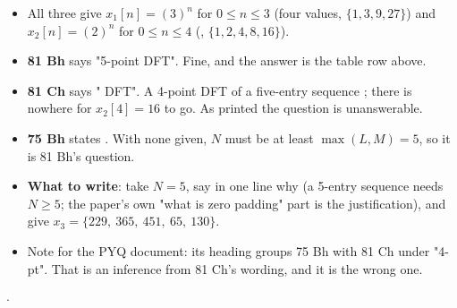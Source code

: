 %
{} {\color{sub}\footnotesize {}}
\begin{itemize}
  \item All three give $x_1[n]=(3)^n$ for $0\le n\le3$ (four values, $\{1,3,9,27\}$) and
        $x_2[n]=(2)^n$ for $0\le n\le4$ (, $\{1,2,4,8,16\}$).
  \item \textbf{81 Bh} says "5-point DFT". Fine, and the answer is the table row above.
  \item \textbf{81 Ch} says " DFT". A 4-point DFT of a five-entry sequence
        ; there is nowhere for $x_2[4]=16$ to go. As printed the
        question is unanswerable.
  \item \textbf{75 Bh} states . With none given, $N$ must be at least
        $\max(L,M)=5$, so it is 81 Bh's question.
  \item \textbf{What to write}: take $N=5$, say in one line why (a 5-entry sequence
        needs $N\ge5$; the paper's own "what is zero padding" part is the justification),
        and give $x_3=\{229,\ 365,\ 451,\ 65,\ 130\}$. 
  \item Note for the PYQ document: its heading groups 75 Bh with 81 Ch under "4-pt".
        That is an inference from 81 Ch's wording, and it is the wrong one.
\end{itemize}

{\color{sub}\footnotesize {}  \gap$\cdot$\gap {}}

